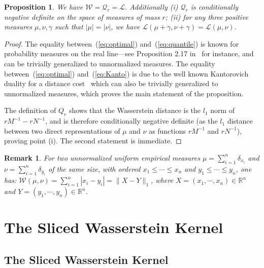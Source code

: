 \documentclass[11pt]{article}
\newcommand{\R}{\mathbb{R}}
\newtheorem{prop}[thm]{Proposition}
\newtheorem{rem}[thm]{Remark}
\begin{document}
\begin{prop}
We have $\mathcal{W}=\mathcal{Q}_r=\mathcal{L}$. 
Additionally 
\emph{(i)} $\mathcal{Q}_r$ is conditionally negative definite on the space of measures of mass $r$; 
\emph{(ii)} for any three positive measures $\mu,\nu,\gamma$ such that $|\mu|=|\nu|$, 
we have $\mathcal{L}(\mu+\gamma,\nu+\gamma)=\mathcal{L}(\mu,\nu)$.
\end{prop}


\begin{proof} The equality between~(\ref{eq:optimal}) and~(\ref{eq:quantile}) is known for probability measures on the 
real line---see Proposition 2.17 in~\cite{Santambrogio15} for instance, and can be trivially generalized to unnormalized measures. 
The equality between~(\ref{eq:optimal}) and~(\ref{eq:Kanto}) is due to the well known Kantorovich duality for a distance 
cost~\cite[Particular case 5.4]{Villani09} which can also be trivially generalized to unnormalized measures, 
which proves the main statement of the proposition. 

The definition of $Q_r$ shows that the Wasserstein distance 
is the $l_1$ norm of $r M^{-1}- r N^{-1}$, and is therefore conditionally negative definite (as the $l_1$ distance 
between two direct representations of $\mu$ and $\nu$ as functions $r M^{-1}$ and $r N^{-1}$), proving point (i). 
The second statement is immediate.
\end{proof}



\begin{rem} For two unnormalized uniform empirical measures 
$\mu=\sum_{i=1}^n \delta_{x_i}$ and $\nu=\sum_{i=1}^n \delta_{y_i}$ of the same size, with ordered 
$x_1\leq \cdots \leq x_{n}$ and $y_1\leq \cdots \leq y_{n}$, one has:
$\mathcal{W}(\mu,\nu)=\sum_{i=1}^n|x_i-y_i|=\|X-Y\|_1$, where $X=(x_1,\cdots,x_n)\in\R^n$ and $Y=(y_1,\cdots,y_n)\in\R^n$.
\end{rem}









\section{The Sliced Wasserstein Kernel}

\subsection{The Sliced Wasserstein Kernel}
\end{document}
